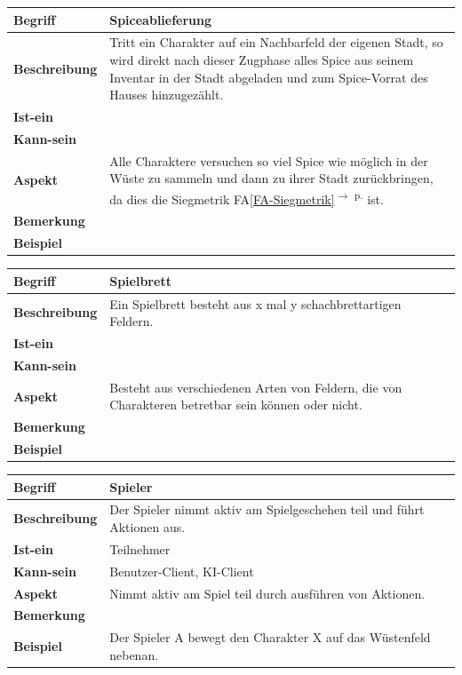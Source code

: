 \documentclass[12pt]{article}
\newcounter{fa}
\newcommand{\faref}[1]{FA\ref{#1}\textsuperscript{$\rightarrow$ p. \pageref{#1}}}
\begin{document}
\begin{tabularx}{\linewidth}{|l|X|}
\hline
\textbf{Begriff} & \textbf{Spiceablieferung} \\
\hline
\textbf{Beschreibung} & Tritt ein Charakter auf ein Nachbarfeld der eigenen Stadt, so wird direkt nach dieser Zugphase alles Spice aus seinem Inventar in der Stadt abgeladen und zum Spice-Vorrat des Hauses hinzugezählt. \\
\hline
\textbf{Ist-ein} & \\
\hline
\textbf{Kann-sein} & \\
\hline
\textbf{Aspekt} & Alle Charaktere versuchen so viel Spice wie möglich in der Wüste zu sammeln und dann zu ihrer Stadt zurückbringen, da dies die Siegmetrik \faref{FA-Siegmetrik} ist.\\
\hline
\textbf{Bemerkung} &  \\
\hline
\textbf{Beispiel} &  \\
\hline
\end{tabularx}

\begin{tabularx}{\linewidth}{|l|X|}
\hline
\textbf{Begriff} & \textbf{Spielbrett} \\
\hline
\textbf{Beschreibung} & Ein Spielbrett besteht aus x mal y schachbrettartigen Feldern.  \\
\hline
\textbf{Ist-ein} & \\
\hline
\textbf{Kann-sein} & \\
\hline
\textbf{Aspekt} & Besteht aus verschiedenen Arten von Feldern, die von Charakteren betretbar sein können oder nicht. \\
\hline
\textbf{Bemerkung} &  \\
\hline
\textbf{Beispiel} &  \\
\hline
\end{tabularx}

\begin{tabularx}{\linewidth}{|l|X|}
\hline
\textbf{Begriff} & \textbf{Spieler} \\
\hline
\textbf{Beschreibung} & Der Spieler nimmt aktiv am Spielgeschehen teil und führt Aktionen aus. \\
\hline
\textbf{Ist-ein} & Teilnehmer \\
\hline
\textbf{Kann-sein} & Benutzer-Client, KI-Client\\
\hline
\textbf{Aspekt} & Nimmt aktiv am Spiel teil durch ausführen von Aktionen.\\
\hline
\textbf{Bemerkung} &  \\
\hline
\textbf{Beispiel} & Der Spieler A bewegt den Charakter X auf das Wüstenfeld nebenan. \\
\hline
\end{tabularx}
\end{document}
